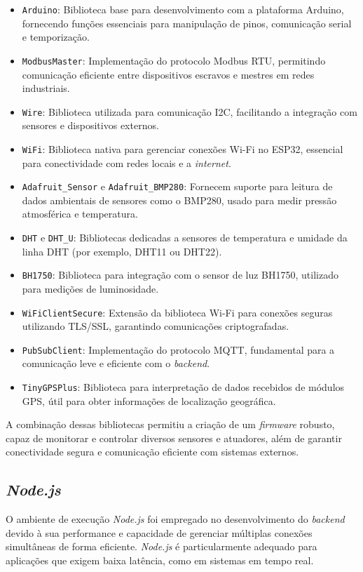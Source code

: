\begin{itemize}
    \item \texttt{Arduino}: Biblioteca base para desenvolvimento com a plataforma Arduino, fornecendo funções essenciais para manipulação de pinos, comunicação serial e temporização.
    \item \texttt{ModbusMaster}: Implementação do protocolo Modbus RTU, permitindo comunicação eficiente entre dispositivos escravos e mestres em redes industriais.
    \item \texttt{Wire}: Biblioteca utilizada para comunicação I2C, facilitando a integração com sensores e dispositivos externos.
    \item \texttt{WiFi}: Biblioteca nativa para gerenciar conexões Wi-Fi no ESP32, essencial para conectividade com redes locais e a \textit{internet}.
    \item \texttt{Adafruit\_Sensor} e \texttt{Adafruit\_BMP280}: Fornecem suporte para leitura de dados ambientais de sensores como o BMP280, usado para medir pressão atmosférica e temperatura.
    \item \texttt{DHT} e \texttt{DHT\_U}: Bibliotecas dedicadas a sensores de temperatura e umidade da linha DHT (por exemplo, DHT11 ou DHT22).
    \item \texttt{BH1750}: Biblioteca para integração com o sensor de luz BH1750, utilizado para medições de luminosidade.
    \item \texttt{WiFiClientSecure}: Extensão da biblioteca Wi-Fi para conexões seguras utilizando TLS/SSL, garantindo comunicações criptografadas.
    \item \texttt{PubSubClient}: Implementação do protocolo MQTT, fundamental para a comunicação leve e eficiente com o \textit{backend}.
    \item \texttt{TinyGPSPlus}: Biblioteca para interpretação de dados recebidos de módulos GPS, útil para obter informações de localização geográfica.
\end{itemize}

A combinação dessas bibliotecas permitiu a criação de um \textit{firmware} robusto, capaz de monitorar e controlar diversos sensores e atuadores, além de garantir conectividade segura e comunicação eficiente com sistemas externos.

\subsection{\textit{Node.js}}
O ambiente de execução \textit{Node.js} foi empregado no desenvolvimento do \textit{backend} devido à sua performance e capacidade de gerenciar múltiplas conexões simultâneas de forma eficiente. \textit{Node.js} é particularmente adequado para aplicações que exigem baixa latência, como em sistemas em tempo real.

